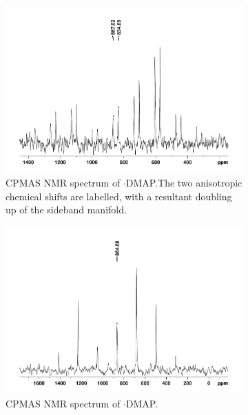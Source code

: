 \begin{refsection}
\begin{figure}
  \centering
  \begin{subfigure}{\linewidth}
    \centering
    \includegraphics[height=0.28\textheight]{Figures/ebs-4ome-dmap-cpmas-77se.pdf}
    \caption{ CPMAS NMR spectrum of $ \cdot $DMAP.\@ The two anisotropic chemical shifts are labelled, with a resultant doubling up of the sideband manifold.}
  \end{subfigure}
  \begin{subfigure}{\linewidth}
    \centering
    \includegraphics[height=0.28\textheight]{Figures/ebs-ph-dmap-cpmas-77se.pdf}
    \caption{ CPMAS NMR spectrum of $ \cdot $DMAP.}
  \end{subfigure}
  \begin{subfigure}{\linewidth}

\end{subfigure}
\end{figure}
\end{refsection}
